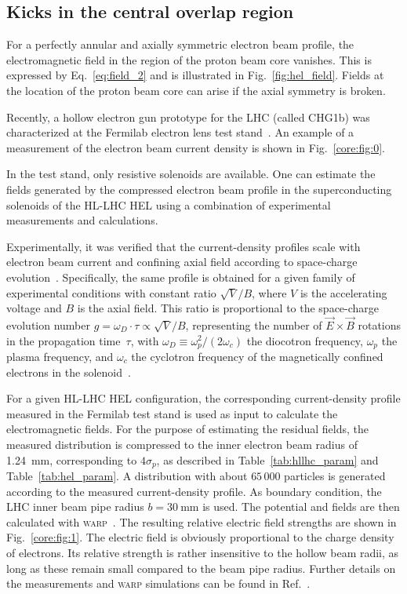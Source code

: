 \documentclass[aps
,prstab
,reprint
,longbibliography
,preprintnumbers
,showkeys
,amsfonts,amssymb,amsmath
,floatfix
]{revtex4-1}
\newcommand{\q}[2]{\ensuremath{#1\ \mathrm{#2}}} %
\newcommand{\code}[1]{\textsc{#1}} %
\begin{document}
\subsection{Kicks in the central overlap region}
\label{core:sec:2}

For a perfectly annular and axially symmetric electron beam profile,
the electromagnetic field in the region of the proton beam core
vanishes. This is expressed by Eq.~\ref{eq:field_2} and is illustrated
in Fig.~\ref{fig:hel_field}. Fields at the location of the proton beam
core can arise if the axial symmetry is broken.

Recently, a hollow electron gun prototype for the LHC (called CHG1b)
was characterized at the Fermilab electron lens test
stand~\cite{hel_test_stand_fnal}. An example of a measurement of the
electron beam current density is shown in Fig.~\ref{core:fig:0}.

In the test stand, only resistive solenoids are available. One can
estimate the fields generated by the compressed electron beam profile
in the superconducting solenoids of the HL-LHC HEL using a combination
of experimental measurements and calculations.

Experimentally, it was verified that the current-density profiles
scale with electron beam current and confining axial field according
to space-charge evolution~\cite{Jo:PoP:2018,
  hel_res_field_stancari_2017}. Specifically, the same profile is
obtained for a given family of experimental conditions with constant
ratio $\sqrt{V} / B$, where $V$ is the accelerating voltage and $B$ is
the axial field. This ratio is proportional to the space-charge
evolution number $g = \omega_D \cdot \tau \propto \sqrt{V}/B$,
representing the number of $\vec{E} \times \vec{B}$ rotations in the
propagation time~$\tau$, with
$\omega_D \equiv \omega_p^2 / (2 \omega_c)$ the diocotron frequency,
$\omega_p$ the plasma frequency, and $\omega_c$ the cyclotron
frequency of the magnetically confined electrons in the
solenoid~\cite{Davidson:nonneutral-plasmas:2001}.

For a given HL-LHC HEL configuration, the corresponding
current-density profile measured in the Fermilab test stand is used as
input to calculate the electromagnetic fields. For the purpose of
estimating the residual fields, the measured distribution is
compressed to the inner electron beam radius of 1.24~mm, corresponding
to $4\sigma_p$, as described in Table~\ref{tab:hllhc_param} and
Table~\ref{tab:hel_param}. A distribution with about $65\,000$
particles is generated according to the measured current-density
profile. As boundary condition, the LHC inner beam pipe radius
$b = \q{30}{mm}$ is used. The potential and fields are then calculated
with \code{warp}~\cite{warp, Friedman:IEEE-plasma:2014}. The resulting
relative electric field strengths are shown in
Fig.~\ref{core:fig:1}. The electric field is obviously proportional to
the charge density of electrons. Its relative strength is rather
insensitive to the hollow beam radii, as long as these remain small
compared to the beam pipe radius. Further details on the measurements
and \code{warp} simulations can be found in
Ref.~\cite{hel_res_field_stancari_2017}.
\end{document}
